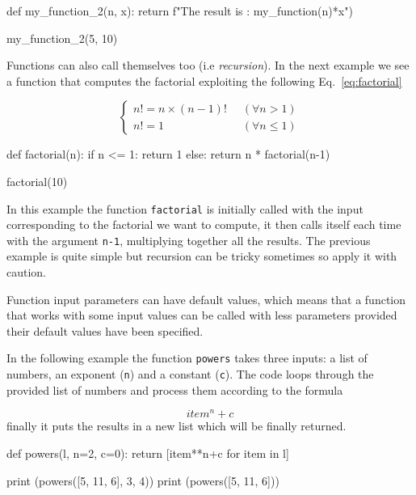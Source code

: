 \begin{ipythonnon}
def my_function_2(n, x):
    return f"The result is : {my_function(n)*x}")

my_function_2(5, 10)
\end{ipythonnon}

Functions can also call themselves too (i.e \emph{recursion}). In the next example we see a function that computes the factorial exploiting the following Eq.~\ref{eq:factorial}

\begin{equation}
\begin{cases}
    n! = n \times (n-1)! & \;\; (\forall n > 1) \\
    n! = 1 & \;\; (\forall n \le 1)
\end{cases}
\label{eq:factorial}
\end{equation}

\begin{ipythonnon}
def factorial(n):
    if n <= 1:
        return 1
    else:
        return n * factorial(n-1)

factorial(10)
\end{ipythonnon}

In this example the function \texttt{factorial} is initially called with the input corresponding to the factorial we want to compute, it then calls itself each time with the argument \texttt{n-1}, multiplying together all the results. The previous example is quite simple but recursion can be tricky sometimes so apply it with caution. 

Function input parameters can have default values, which means that a function that works with some input values can be called with less parameters provided their default values have been specified.

In the following example the function \texttt{powers} takes three inputs: a list of numbers, an exponent (\texttt{n}) and a constant (\texttt{c}). The code loops through the provided list of numbers and process them according to the formula 

\begin{equation*}
item^{n} + c
\end{equation*}
finally it puts the results in a new list which will be finally returned.

\begin{ipythonnon}
def powers(l, n=2, c=0):
    return [item**n+c for item in l]

print (powers([5, 11, 6], 3, 4))
print (powers([5, 11, 6]))
\end{ipythonnon}
\begin{ioutput}
[129, 1335, 220]
[25, 121, 36]
\end{ioutput}
    
